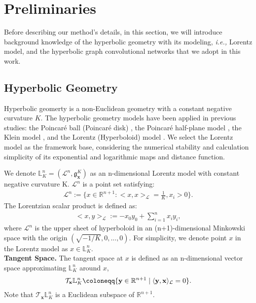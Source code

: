 \documentclass[sigconf]{acmart}
\newcommand{\ie}{{\emph{i.e., }}}
\newcommand{\Lc}{\mathcal{L}}
\newcommand{\poincare}{Poincar\'e }
\newcommand{\lorentz}{\mathbb{L}^n_K}
\newcommand{\linner}[2]{\langle \mathbf{#1},\mathbf{#2}\rangle_\Lc}
\newcommand{\tangent}[1]{\mathcal{T}_{\mathbf{#1}}\mathbb{L}^n_K}
\newcommand{\riemanntensor}[1][x]{\mathfrak{g}_\mathbf{x}^K}
\begin{document}
\section{Preliminaries}
Before describing our method's details, in this section, we will introduce background knowledge of the hyperbolic geometry with its modeling, \ie Lorentz model, and the hyperbolic graph convolutional networks that we adopt in this work.
\subsection{Hyperbolic Geometry}
\label{subsec:3_1}
Hyperbolic geomerty is a non-Euclidean geometry with a constant negative curvature $K$. The hyperbolic geometry models have been applied in previous studies: the \poincare ball (\poincare disk) \cite{ganea2018hyperbolic}, the \poincare half-plane model \cite{tifrea2018poincar}, the Klein model \cite{gulcehre2018hyperbolic}, and the Lorentz (Hyperboloid) model \cite{Nickel_Kiela_2018}. We select the Lorentz model as the framework base, considering the numerical stability and calculation simplicity of its exponential and logarithmic maps and distance function.

We denote $\lorentz=(\Lc^n, \riemanntensor)$ as an n-dimensional Lorentz model with constant negative curvature K. $\Lc^n$ is a point set satisfying:
\begin{align}
\label{eq1}
  \Lc^n:=\{{x\in\mathbb{R}^{n+1}: <x,x>_{\Lc}=\frac{1}{K}, x_i>0}\}.
\end{align}
The Lorentzian scalar product is defined as:
\begin{align}
\label{eq2}
<x, y>_{\Lc}:=-x_0y_0+\sum_{i=1}^{n}{x_iy_i}, 
\end{align}
where $\Lc^n$ is the upper sheet of hyperboloid in an (n+1)-dimensional Minkowski space with the origin $(\sqrt{-1/K}, 0,...,0)$. For simplicity, we denote point $x$ in the Lorentz model as $x\in\mathbb{L}^n_K$.\\

\noindent\textbf{Tangent Space.} The tangent space at $x$ is defined as an n-dimensional vector space approximating $\lorentz$ around $x$,
\begin{align}
\label{eq3}
\tangent{x}\coloneqq\{\mathbf{y}\in \Real^{n+1} \mid \linner{y}{x}=0\}.
\end{align}
Note that $\tangent{x}$ is a Euclidean subspace of $\mathbb{R}^{n+1}$.\\
\end{document}
